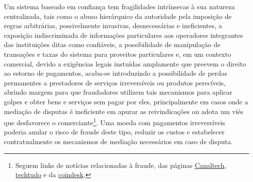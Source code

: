 \documentclass[a4paper,11pt]{article}
\begin{document}
Um sistema baseado em confiança tem fragilidades intrínsecas à sua natureza centralizada, tais como o abuso hierárquico da autoridade pela imposição de regras arbitrárias, possivelmente invasivas, desnecessárias e ineficientes, a exposição indiscriminada de informações particulares aos operadores integrantes das instituições ditas como confiáveis, a possibilidade de manipulação de transações e taxas do sistema para proveitos particulares e, em um contexto comercial, devido a exigências legais instuídas amplamente que preevem o direito ao estorno de pagamentos, acaba-se introduzindo a possibilidade de perdas permanentes a prestadores de serviços irreversíveis ou produtos perecíveis, abrindo margem para que fraudadores utilizem tais mecanismos para aplicar golpes e obter bens e serviços sem pagar por eles, principalmente em casos onde a mediação de disputas é ineficiente em apurar as reivindicações ou adota um viés que desfavorece o comerciante\footnote{Seguem links de notícias relacionadas à fraude, das páginas \href{https://canaltech.com.br/e-commerce/golpe-pedra-mercado-livre-115288/}{Canaltech}, \href{https://www.techtudo.com.br/noticias/2019/07/golpe-da-compra-falsa-faz-vitimas-no-mercado-livre-veja-como-evitar.ghtml}{techtudo} e da \href{https://www.coindesk.com/how-fraud-sunk-bitcoin-exchange}{coindesk}.}. Uma moeda com pagamentos irreversíveis poderia anular o risco de fraude deste tipo, reduzir os custos e estabelecer contratualmente os mecanismos de mediação necessários em caso de disputa.
\end{document}
